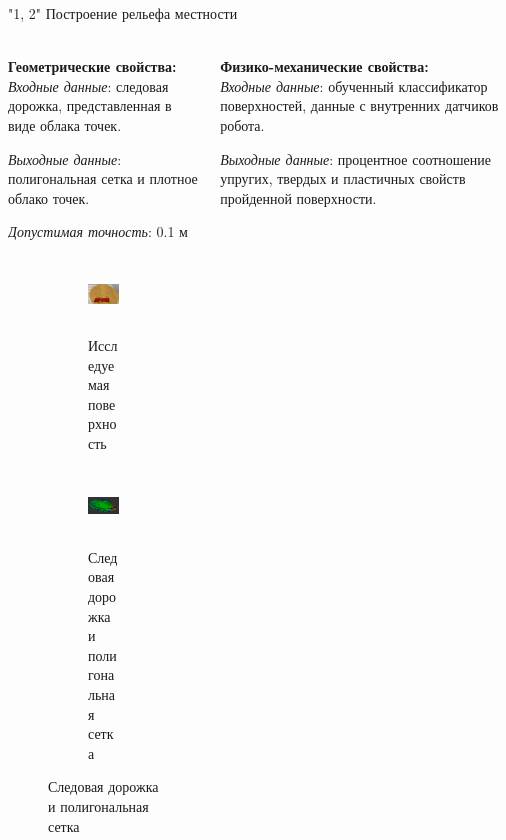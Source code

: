 \documentclass[aspectratio=169,xcolor=table,10pt]{beamer}
\begin{document}
\begin{frame}[t]{"1, 2" Построение рельефа местности}
    \framesubtitle{}
    \begin{columns}[T,onlytextwidth]
        \begin{column}{0.49\textwidth}
            \textbf{Геометрические свойства:}\\
            \textit{Входные данные}: следовая дорожка, представленная в виде облака точек.

            \textit{Выходные данные}: полигональная сетка и плотное облако точек.

            \textit{Допустимая точность}: 0.1 м
            \begin{figure}[H]
                \begin{subfigure}{0.49\textwidth}
                    \centering\includegraphics[height=2cm,width=1\textwidth,keepaspectratio]{../images/slides/surface_research.png}
                    \caption{Исследуемая поверхность}
                    \label{fig:../images/slides/surface_research.png}
                \end{subfigure}
                \begin{subfigure}{0.49\textwidth}
                    \centering\includegraphics[height=2cm,width=1\textwidth,keepaspectratio]{../images/slides/result_research.png}
                    \caption{Следовая дорожка и полигональная сетка}
                    \label{fig:../images/slides/result_research.png}
                \end{subfigure}
            \end{figure}
        \end{column}
        \begin{column}{0.49\textwidth}
            \textbf{Физико-механические свойства:}\\
            \textit{Входные данные}: обученный классификатор поверхностей, данные с внутренних датчиков робота.

            \textit{Выходные данные}: процентное соотношение упругих, твердых и пластичных свойств пройденной поверхности.


\end{column}
\end{columns}
\end{frame}
\end{document}
